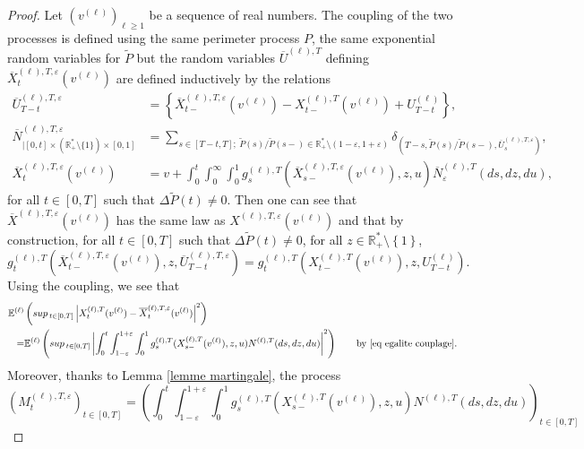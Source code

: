 \documentclass[10pt,a4paper]{amsart}
\def\E{\mathbb{E}}
\def \R{\mathbb {R}}
\renewcommand{\sup}{sup\,}
\def\vp{\varepsilon}
\begin{document}
\begin{proof}
Let $(v^{(\ell)})_{\ell \ge 1}$ be a sequence of real numbers. The coupling of the two processes is defined using the same perimeter process $P$, the same exponential random variables for $\widetilde{P}$ but the random variables $\overline{U}^{(\ell),T}$ defining $\overline{X}^{(\ell),T,\vp}_t(v^{(\ell)})$ are defined inductively by the relations
\begin{align}
\overline{U}_{T-t}^{(\ell),T,\vp}&= \left\{ \overline{X}^{(\ell),T,\vp}_{t-}(v^{(\ell)}) - X^{(\ell),T}_{t-}(v^{(\ell)}) + U^{(\ell)}_{T-t}\right\}, \\
\overline{N}^{(\ell),T,\vp}_{\vert [0,t]\times (\R^*_+\setminus \{1\})\times [0,1]} 
&= \sum_{s\in [T-t,T]; \ \widetilde{P}(s)/\widetilde{P}(s-) \in \R_+^*\setminus (1-\vp, 1+\vp)} \delta_{(T-s,\widetilde{P}(s)/\widetilde{P}(s-), \overline{U}^{(\ell),T,\vp}_{s})}, \\
\overline{X}^{(\ell),T,\vp}_t(v^{(\ell)}) &= v+ \int_0^t \int_0^\infty \int_0^1 g^{(\ell),T}_s(\overline{X}^{(\ell),T,\vp}_{s-}(v^{(\ell)}),z,u) \overline{N}^{(\ell), T}_\vp(ds,dz,du),
\end{align}
for all $t\in [0,T]$ such that $\Delta \widetilde{P}(t)\neq 0$. Then one can see that $\overline{X}^{(\ell),T,\vp}(v^{(\ell)})$ has the same law as ${X}^{(\ell),T,\vp}(v^{(\ell)})$ and that by construction, for all $t\in [0,T]$ such that $\Delta \widetilde{P}(t)\neq 0$, for all $z \in \R_+^*\setminus \left\{1\right\}$, 
\begin{equation}\label{eq egalite couplage}
g^{(\ell),T}_t(\overline{X}^{(\ell),T,\vp}_{t-}(v^{(\ell)}), z, \overline{U}_{T-t}^{(\ell),T,\vp}) = g^{(\ell),T}_t(X^{(\ell),T}_{t-}(v^{(\ell)}), z, U^{(\ell)}_{T-t}).
\end{equation}
Using the coupling, we see that
\begin{align*}
\E^{(\ell)} 
&\left(\sup_{t\in [0,T]} 
\left|
X^{(\ell),T}_t(v^{(\ell)})
-
\overline{X}^{(\ell),T,\vp}_t(v^{(\ell)})
\right|^2
\right)
\\
=
&\E^{(\ell)} 
\left(\sup_{t\in [0,T]} 
\left|
\int_0^t \int_{1-\vp}^{1+\vp} \int_0^1
g^{(\ell),T}_s(X^{(\ell),T}_{s-}(v^{(\ell)}),z,u)
N^{(\ell),T}(ds, dz, du)
\right|^2
\right)
\qquad
\text{by } \eqref{eq egalite couplage}.
\end{align*}
Moreover, thanks to Lemma \ref{lemme martingale}, the process
$$
(M_t^{(\ell),T,\vp})_{t \in [0,T]}
=
\left(
\int_{0}^t
\int_{1-\vp}^{1+\vp}
\int_0^1
g^{(\ell),T}_s(X^{(\ell),T}_{s-}(v^{(\ell)}),z,u) {N}^{(\ell),T} (ds, dz, du)
\right)_{t \in [0,T]}
$$
\end{proof}
\end{document}
